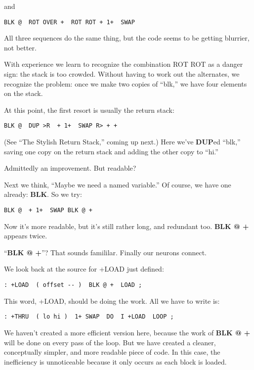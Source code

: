 and

\begin{verbatim}
BLK @  ROT OVER +  ROT ROT + 1+  SWAP
\end{verbatim}

All three sequences do the same thing, but the code seems to be getting
blurrier, not better.

With experience we learn to recognize the combination ROT ROT as
a danger sign: the stack is too crowded. Without having to work out the
alternates, we recognize the problem: once we make two copies of ``blk,''
we have four elements on the stack.

At this point, the first resort is usually the return stack:

\begin{verbatim}
BLK @  DUP >R  + 1+  SWAP R> + +
\end{verbatim}

(See ``The Stylish Return Stack,'' coming up next.) Here we've \textbf{DUP}ed
``blk,'' saving one copy on the return stack and adding the other copy to
``hi.''

Admittedly an improvement. But readable?

Next we think, ``Maybe we need a named variable.'' Of course, we
have one already: \textbf{BLK}. So we try:

\begin{verbatim}
BLK @  + 1+  SWAP BLK @ +
\end{verbatim}

Now it's more readable, but it's still rather long, and redundant too.
\textbf{BLK @ +} appears twice.

``\textbf{BLK @ +}''? That sounds famililar. Finally our neurons connect.

We look back at the source for +LOAD just defined:

\begin{verbatim}
: +LOAD  ( offset -- )  BLK @ +  LOAD ;
\end{verbatim}

This word, +LOAD, should be doing the work. All we have to write is:

\begin{verbatim}
: +THRU  ( lo hi )  1+ SWAP  DO  I +LOAD  LOOP ;
\end{verbatim}

We haven't created a more efficient version here, because the work of
\textbf{BLK @ +} will be done on every pass of the loop. But we have created a
cleaner, conceptually simpler, and more readable piece of code. In this
case, the inefficiency is unnoticeable because it only occurs as each block
is loaded.

